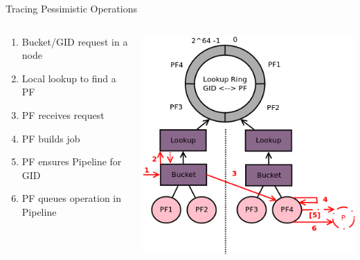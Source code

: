 \documentclass[aspectratio=169]{beamer}
\begin{document}
\begin{frame}{Tracing Pessimistic Operations}
    \begin{columns}
        \begin{column}[c]{0.5\textwidth}
            \begin{enumerate}
                \item Bucket/GID request in a node
                \item Local lookup to find a PF
                \item PF receives request
                \item PF builds job
                \item PF ensures Pipeline for GID
                \item PF queues operation in Pipeline
            \end{enumerate}
        \end{column}
        \begin{column}[c]{0.5\textwidth}
            \includegraphics[width=\textwidth]{images/tracingpessimistic.png}
        \end{column}
    \end{columns}
\end{frame}
\end{document}
